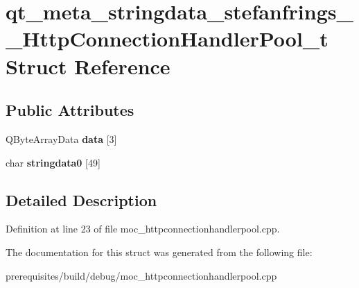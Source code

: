 \hypertarget{structqt__meta__stringdata__stefanfrings_____http_connection_handler_pool__t}{}\section{qt\+\_\+meta\+\_\+stringdata\+\_\+stefanfrings\+\_\+\+\_\+\+Http\+Connection\+Handler\+Pool\+\_\+t Struct Reference}
\label{structqt__meta__stringdata__stefanfrings_____http_connection_handler_pool__t}
\subsection*{Public Attributes}
\begin{DoxyCompactItemize}
\item 
\mbox{\label{structqt__meta__stringdata__stefanfrings_____http_connection_handler_pool__t_a06403dcd9f04df246eeaf46f5af800c6}} 
Q\+Byte\+Array\+Data {\bfseries data} \mbox{[}3\mbox{]}
\item 
\mbox{\label{structqt__meta__stringdata__stefanfrings_____http_connection_handler_pool__t_afc2faa38fe256d4741b059475db07c9e}} 
char {\bfseries stringdata0} \mbox{[}49\mbox{]}
\end{DoxyCompactItemize}


\subsection{Detailed Description}


Definition at line 23 of file moc\+\_\+httpconnectionhandlerpool.\+cpp.



The documentation for this struct was generated from the following file\+:\begin{DoxyCompactItemize}
\item 
prerequisites/build/debug/moc\+\_\+httpconnectionhandlerpool.\+cpp\end{DoxyCompactItemize}
